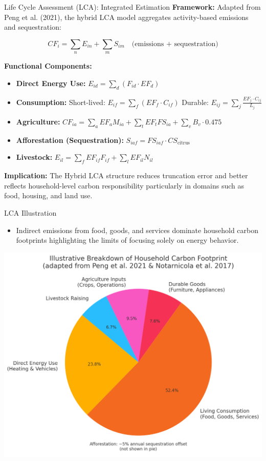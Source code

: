 \documentclass{beamer}
\begin{document}
\begin{frame}{Life Cycle Assessment (LCA): Integrated Estimation}
\footnotesize
\vspace{-2.0em}
\textbf{Framework:}  
Adapted from Peng et al. (2021), the hybrid LCA model aggregates activity-based emissions and sequestration:

\[
CF_i = \sum_n E_{in} + \sum_m S_{im}
\quad \text{(emissions + sequestration)}
\]

\vspace{0.3em}
\textbf{Functional Components:}
\begin{itemize}
  \item \textbf{Direct Energy Use:} $E_{id} = \sum_d (F_{id} \cdot EF_d)$
  \item \textbf{Consumption:} Short-lived: $E_{if} = \sum_f (EF_f \cdot C_{if})$  
        Durable: $E_{ij} = \sum_j \frac{EF_j \cdot C_{ij}}{L_j}$
  \item \textbf{Agriculture:} $CF_{ia} = \sum_a EF_a M_{ia} + \sum_t EF_t FS_{ia} + \sum_v B_v \cdot 0.475$
  \item \textbf{Afforestation (Sequestration):} $S_{iaf} = FS_{iaf} \cdot CS_{\text{citrus}}$
  \item \textbf{Livestock:} $E_{il} = \sum_f EF_{if} F_{if} + \sum_l EF_{il} N_{il}$
\end{itemize}

\vspace{0.3em}
\textbf{Implication:}  
The Hybrid LCA structure reduces truncation error and better reflects household-level carbon responsibility particularly in domains such as food, housing, and land use.
\end{frame}

\begin{frame}{LCA Illustration}
\vspace{-2.5em}
\footnotesize
\begin{itemize}
  \item Indirect emissions from food, goods, and services dominate household carbon footprints highlighting the limits of focusing solely on energy behavior.
\end{itemize}
\begin{center}
\includegraphics[width=0.68\linewidth]{LCA_pie.png}
\end{center}


\end{frame}
\end{document}

